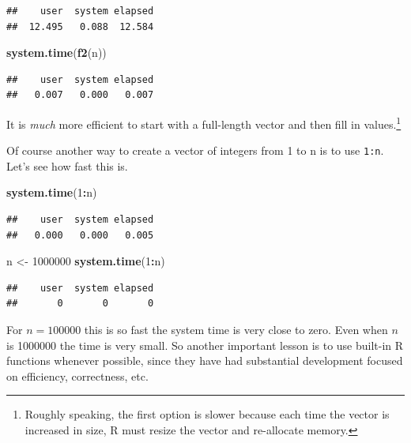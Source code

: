 \documentclass[
]{krantz}
\newenvironment{Shaded}{\begin{snugshade}}{\end{snugshade}}
\newcommand{\DecValTok}[1]{\textcolor[rgb]{0.00,0.00,0.81}{#1}}
\newcommand{\KeywordTok}[1]{\textcolor[rgb]{0.13,0.29,0.53}{\textbf{#1}}}
\newcommand{\NormalTok}[1]{#1}
\newcommand{\OperatorTok}[1]{\textcolor[rgb]{0.81,0.36,0.00}{\textbf{#1}}}
\newcommand{\StringTok}[1]{\textcolor[rgb]{0.31,0.60,0.02}{#1}}
\begin{document}
\begin{verbatim}
##    user  system elapsed 
##  12.495   0.088  12.584
\end{verbatim}

\begin{Shaded}
\begin{Highlighting}[]
\KeywordTok{system.time}\NormalTok{(}\KeywordTok{f2}\NormalTok{(n))}
\end{Highlighting}
\end{Shaded}

\begin{verbatim}
##    user  system elapsed 
##   0.007   0.000   0.007
\end{verbatim}

It is \emph{much} more efficient to start with a full-length vector and then fill in values.\footnote{Roughly speaking, the first option is slower because each time the vector is increased in size, R must resize the vector and re-allocate memory.}

Of course another way to create a vector of integers from 1 to n is to use \texttt{1:n}. Let's see how fast this is.

\begin{Shaded}
\begin{Highlighting}[]
\KeywordTok{system.time}\NormalTok{(}\DecValTok{1}\OperatorTok{:}\NormalTok{n)}
\end{Highlighting}
\end{Shaded}

\begin{verbatim}
##    user  system elapsed 
##   0.000   0.000   0.005
\end{verbatim}

\begin{Shaded}
\begin{Highlighting}[]
\NormalTok{n \textless{}{-}}\StringTok{ }\DecValTok{1000000}
\KeywordTok{system.time}\NormalTok{(}\DecValTok{1}\OperatorTok{:}\NormalTok{n)      }
\end{Highlighting}
\end{Shaded}

\begin{verbatim}
##    user  system elapsed 
##       0       0       0
\end{verbatim}

For \(n=100000\) this is so fast the system time is very close to zero. Even when \(n\) is 1000000 the time is very small. So another important lesson is to use built-in R functions whenever possible, since they have had substantial development focused on efficiency, correctness, etc.
\end{document}
